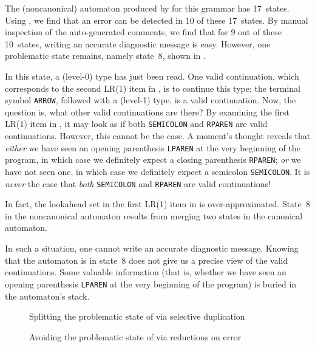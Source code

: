 \documentclass[onecolumn,11pt,nocopyrightspace,preprint]{sigplanconf}
\begin{document}
The (noncanonical) automaton produced by \menhir for this grammar has 17~states.
Using \olisterrors, we find that an error can be detected in 10 of these
17~states. By manual inspection of the auto-generated comments, we find that
for 9 out of these 10~states, writing an accurate diagnostic message is easy. However,
one problematic state remains, namely state~8,
shown in .

In this state, a (level-0) type has just been read. One valid continuation,
which corresponds to the second LR(1) item in ,
is to continue this type: the terminal symbol \verb+ARROW+, followed with a
(level-1) type, is a valid continuation. Now, the question is, what other
valid continuations are there? By examining the first LR(1) item
in , it may look as if both \verb+SEMICOLON+
and \verb+RPAREN+ are valid continuations. However, this cannot be the case. A
moment's thought reveals that \emph{either} we have seen an opening
parenthesis \verb+LPAREN+ at the very beginning of the program, in which case
we definitely expect a closing parenthesis \verb+RPAREN+; \emph{or} we have
not seen one, in which case we definitely expect a semicolon \verb+SEMICOLON+.
It is \emph{never} the case that \emph{both} \verb+SEMICOLON+
and \verb+RPAREN+ are valid continuations!

In fact, the lookahead set in the first LR(1) item
in  is over-approximated.
State~8 in the noncanonical automaton results from merging two states
in the canonical automaton.

In such a situation, one cannot write an accurate diagnostic message.
Knowing that the automaton is in state~8 does not give us a
precise view of the valid continuations. Some valuable information (that is,
whether we have seen an opening parenthesis \verb+LPAREN+ at the very
beginning of the program) is buried in the automaton's stack.

\begin{figure}

\caption{Splitting the problematic state of  via selective duplication}
\label{fig:declarations:phantom}
\end{figure}

\begin{figure}

\caption{Avoiding the problematic state of  via reductions on error}
\label{fig:declarations:onerrorreduce}
\end{figure}
\end{document}
